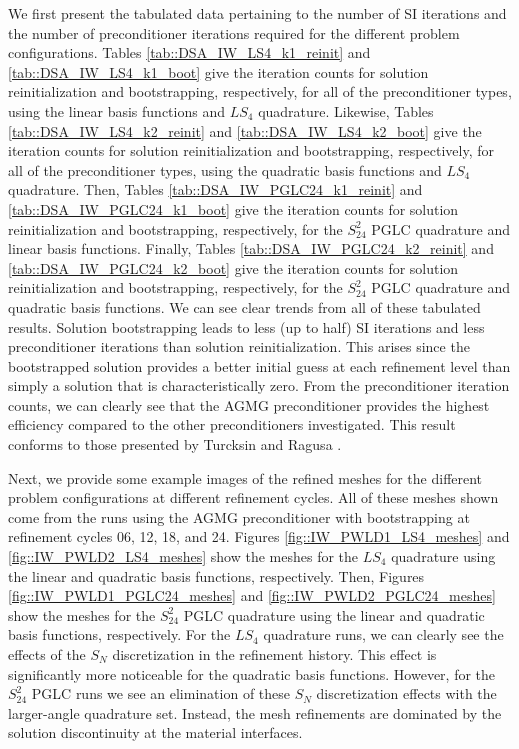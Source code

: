 We first present the tabulated data pertaining to the number of SI iterations and the number of preconditioner iterations required for the different problem configurations. Tables \ref{tab::DSA_IW_LS4_k1_reinit} and \ref{tab::DSA_IW_LS4_k1_boot} give the iteration counts for solution reinitialization and bootstrapping, respectively, for all of the preconditioner types, using the linear basis functions and $LS_4$ quadrature. Likewise, Tables \ref{tab::DSA_IW_LS4_k2_reinit} and \ref{tab::DSA_IW_LS4_k2_boot} give the iteration counts for solution reinitialization and bootstrapping, respectively, for all of the preconditioner types, using the quadratic basis functions and $LS_4$ quadrature. Then, Tables \ref{tab::DSA_IW_PGLC24_k1_reinit} and \ref{tab::DSA_IW_PGLC24_k1_boot} give the iteration counts for solution reinitialization and bootstrapping, respectively, for the $S_{24}^2$ PGLC quadrature and linear basis functions. Finally, Tables \ref{tab::DSA_IW_PGLC24_k2_reinit} and \ref{tab::DSA_IW_PGLC24_k2_boot} give the iteration counts for solution reinitialization and bootstrapping, respectively, for the $S_{24}^2$ PGLC quadrature and quadratic basis functions. We can see clear trends from all of these tabulated results. Solution bootstrapping leads to less (up to half) SI iterations and less preconditioner iterations than solution reinitialization. This arises since the bootstrapped solution provides a better initial guess at each refinement level than simply a solution that is characteristically zero. From the preconditioner iteration counts, we can clearly see that the AGMG preconditioner provides the highest efficiency compared to the other preconditioners investigated. This result conforms to those presented by Turcksin and Ragusa \cite{turcksin2014discontinuous}.

Next, we provide some example images of the refined meshes for the different problem configurations at different refinement cycles. All of these meshes shown come from the runs using the AGMG preconditioner with bootstrapping at refinement cycles 06, 12, 18, and 24. Figures \ref{fig::IW_PWLD1_LS4_meshes} and \ref{fig::IW_PWLD2_LS4_meshes} show the meshes for the $LS_4$ quadrature using the linear and quadratic basis functions, respectively. Then, Figures \ref{fig::IW_PWLD1_PGLC24_meshes} and \ref{fig::IW_PWLD2_PGLC24_meshes} show the meshes for the $S_{24}^2$ PGLC quadrature using the linear and quadratic basis functions, respectively. For the $LS_4$ quadrature runs, we can clearly see the effects of the $S_N$ discretization in the refinement history. This effect is significantly more noticeable for the quadratic basis functions. However, for the $S_{24}^2$ PGLC runs we see an elimination of these $S_N$ discretization effects with the larger-angle quadrature set. Instead, the mesh refinements are dominated by the solution discontinuity at the material interfaces.

